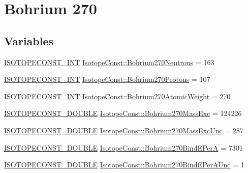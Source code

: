 \hypertarget{group___isotope_const-_bohrium-_bh270}{}\section{Bohrium 270}
\label{group___isotope_const-_bohrium-_bh270}
\subsection*{Variables}
\begin{DoxyCompactItemize}
\item 
\mbox{\hyperlink{group___isotope_const-_macros_ga5f18360b3e99483a35c32d789e62621c}{I\+S\+O\+T\+O\+P\+E\+C\+O\+N\+S\+T\+\_\+\+I\+NT}} \mbox{\hyperlink{group___isotope_const-_bohrium-_bh270_gaf7cea4c9930683b8025981accc01db40}{Isotope\+Const\+::\+Bohrium270\+Neutrons}} = 163
\item 
\mbox{\hyperlink{group___isotope_const-_macros_ga5f18360b3e99483a35c32d789e62621c}{I\+S\+O\+T\+O\+P\+E\+C\+O\+N\+S\+T\+\_\+\+I\+NT}} \mbox{\hyperlink{group___isotope_const-_bohrium-_bh270_ga80e61db693f00643565c3d7018b0723b}{Isotope\+Const\+::\+Bohrium270\+Protons}} = 107
\item 
\mbox{\hyperlink{group___isotope_const-_macros_ga5f18360b3e99483a35c32d789e62621c}{I\+S\+O\+T\+O\+P\+E\+C\+O\+N\+S\+T\+\_\+\+I\+NT}} \mbox{\hyperlink{group___isotope_const-_bohrium-_bh270_gab921285e894f3b56a81848b41a9f1253}{Isotope\+Const\+::\+Bohrium270\+Atomic\+Weight}} = 270
\item 
\mbox{\hyperlink{group___isotope_const-_macros_ga8f45a7272ce02c0b4c65c44636ed719a}{I\+S\+O\+T\+O\+P\+E\+C\+O\+N\+S\+T\+\_\+\+D\+O\+U\+B\+LE}} \mbox{\hyperlink{group___isotope_const-_bohrium-_bh270_ga27c2001a9ba59b56cdc8dad2137ee1d8}{Isotope\+Const\+::\+Bohrium270\+Mass\+Exc}} = 124226
\item 
\mbox{\hyperlink{group___isotope_const-_macros_ga8f45a7272ce02c0b4c65c44636ed719a}{I\+S\+O\+T\+O\+P\+E\+C\+O\+N\+S\+T\+\_\+\+D\+O\+U\+B\+LE}} \mbox{\hyperlink{group___isotope_const-_bohrium-_bh270_ga45ced8bb318a79077ca2812dddf8771b}{Isotope\+Const\+::\+Bohrium270\+Mass\+Exc\+Unc}} = 287
\item 
\mbox{\hyperlink{group___isotope_const-_macros_ga8f45a7272ce02c0b4c65c44636ed719a}{I\+S\+O\+T\+O\+P\+E\+C\+O\+N\+S\+T\+\_\+\+D\+O\+U\+B\+LE}} \mbox{\hyperlink{group___isotope_const-_bohrium-_bh270_ga607ae8bec87ce845c13e411fb093bb6b}{Isotope\+Const\+::\+Bohrium270\+Bind\+E\+PerA}} = 7301
\item 
\mbox{\hyperlink{group___isotope_const-_macros_ga8f45a7272ce02c0b4c65c44636ed719a}{I\+S\+O\+T\+O\+P\+E\+C\+O\+N\+S\+T\+\_\+\+D\+O\+U\+B\+LE}} \mbox{\hyperlink{group___isotope_const-_bohrium-_bh270_ga21c9ec4774d2a02a958049d1ab8ec5c0}{Isotope\+Const\+::\+Bohrium270\+Bind\+E\+Per\+A\+Unc}} = 1

\end{DoxyCompactItemize}
